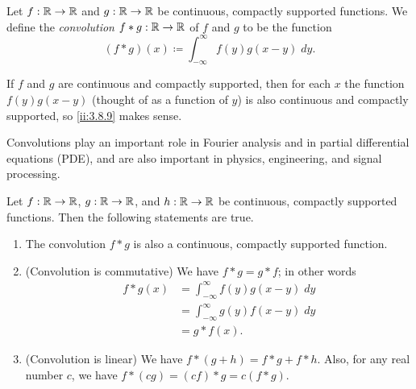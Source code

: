 \begin{defn}[Convolution]\label{ii:3.8.9}
  Let \(f : \mathbb{R} \to \mathbb{R}\) and \(g : \mathbb{R} \to \mathbb{R}\) be continuous, compactly supported functions.
  We define the \emph{convolution} \(f * g : \mathbb{R} \to \mathbb{R}\) of \(f\) and \(g\) to be the function
  \[
    (f * g)(x) \coloneqq \int_{-\infty}^\infty f(y) g(x - y) \; dy.
  \]
\end{defn}

\begin{note}
  If \(f\) and \(g\) are continuous and compactly supported, then for each \(x\) the function \(f(y) g(x - y)\) (thought of as a function of \(y\)) is also continuous and compactly supported, so \cref{ii:3.8.9} makes sense.
\end{note}

\begin{rmk}\label{ii:3.8.10}
  Convolutions play an important role in Fourier analysis and in partial differential equations (PDE), and are also important in physics, engineering, and signal processing.
\end{rmk}

\begin{prop}\label{ii:3.8.11}
  Let \(f : \mathbb{R} \to \mathbb{R}\), \(g : \mathbb{R} \to \mathbb{R}\), and \(h : \mathbb{R} \to \mathbb{R}\) be continuous, compactly supported functions.
  Then the following statements are true.
  \begin{enumerate}
    \item The convolution \(f * g\) is also a continuous, compactly supported function.
    \item (Convolution is commutative)
          We have \(f * g = g * f\);
          in other words
          \begin{align*}
            f * g(x) & = \int_{-\infty}^\infty f(y) g(x - y) \; dy \\
                     & = \int_{-\infty}^\infty g(y) f(x - y) \; dy \\
                     & = g * f(x).
          \end{align*}
    \item (Convolution is linear)
          We have \(f * (g + h) = f * g + f * h\).
          Also, for any real number \(c\), we have \(f * (cg) = (cf) * g = c(f * g)\).
  \end{enumerate}
\end{prop}

